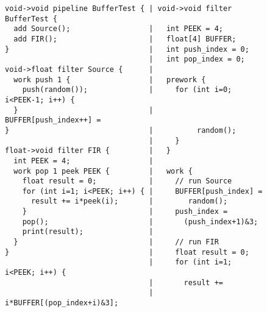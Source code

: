 \begin{figure}[t]

\begin{minipage}{3in}
\centering
{\scriptsize
\begin{verbatim}
void->void pipeline BufferTest { | void->void filter BufferTest {                
  add Source();                  |   int PEEK = 4;                               
  add FIR();                     |   float[4] BUFFER;                               
}                                |   int push_index = 0;                         
                                 |   int pop_index = 0;                             
void->float filter Source {      |                                                  
  work push 1 {                  |   prework {                                      
    push(random());              |     for (int i=0; i<PEEK-1; i++) {               
  }                              |       BUFFER[push_index++] =                     
}                                |          random();                       
                                 |     }                                         
float->void filter FIR {         |   }                                              
  int PEEK = 4;                  |                                                  
  work pop 1 peek PEEK {         |   work {                                         
    float result = 0;            |     // run Source                                
    for (int i=1; i<PEEK; i++) { |     BUFFER[push_index] =                         
      result += i*peek(i);       |        random();                                 
    }                            |     push_index =                                 
    pop();                       |       (push_index+1)&3;                  
    print(result);               |                                                  
  }                              |     // run FIR                                
}                                |     float result = 0;                         
                                 |     for (int i=1; i<PEEK; i++) {                 
                                 |       result +=                                  
                                 |        i*BUFFER[(pop_index+i)&3];                

\end{verbatim}}
\end{minipage}
\end{figure}

